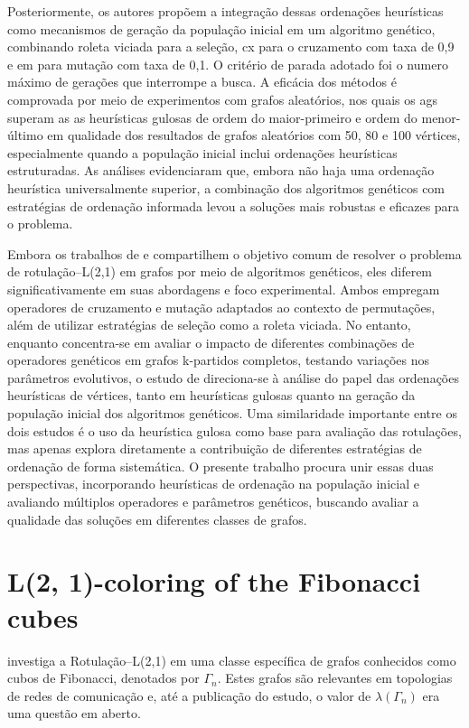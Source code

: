 Posteriormente, os autores propõem a integração dessas ordenações heurísticas como mecanismos de geração da população inicial em um algoritmo genético, combinando roleta viciada para a seleção, \gls{cx} para o cruzamento com taxa de 0{,}9 e \gls{em} para mutação com taxa de 0{,}1. O critério de parada adotado foi o numero máximo de gerações que interrompe a busca. A eficácia dos métodos é comprovada por meio de experimentos com grafos aleatórios, nos quais os \glspl{ag} superam as as heurísticas gulosas de ordem do maior-primeiro e ordem do menor-último em qualidade dos resultados de grafos aleatórios com 50, 80 e 100 vértices, especialmente quando a população inicial inclui ordenações heurísticas estruturadas. As análises evidenciaram que, embora não haja uma ordenação heurística universalmente superior, a combinação dos algoritmos genéticos com estratégias de ordenação informada levou a soluções mais robustas e eficazes para o problema.

Embora os trabalhos de  e  compartilhem o objetivo comum de resolver o problema de rotulação–L(2,1) em grafos por meio de algoritmos genéticos, eles diferem significativamente em suas abordagens e foco experimental. Ambos empregam operadores de cruzamento e mutação adaptados ao contexto de permutações, além de utilizar estratégias de seleção como a roleta viciada. No entanto, enquanto  concentra-se em avaliar o impacto de diferentes combinações de operadores genéticos em grafos k-partidos completos, testando variações nos parâmetros evolutivos, o estudo de  direciona-se à análise do papel das ordenações heurísticas de vértices, tanto em heurísticas gulosas quanto na geração da população inicial dos algoritmos genéticos. Uma similaridade importante entre os dois estudos é o uso da heurística gulosa como base para avaliação das rotulações, mas apenas  explora diretamente a contribuição de diferentes estratégias de ordenação de forma sistemática. O presente trabalho procura unir essas duas perspectivas, incorporando heurísticas de ordenação na população inicial e avaliando múltiplos operadores e parâmetros genéticos, buscando avaliar a qualidade das soluções em diferentes classes de grafos.

\section{L(2, 1)-coloring of the Fibonacci cubes}

 investiga a Rotulação–L(2,1) em uma classe específica de grafos conhecidos como cubos de Fibonacci, denotados por $\Gamma_n$. Estes grafos são relevantes em topologias de redes de comunicação e, até a publicação do estudo, o valor de $\lambda(\Gamma_n)$ era uma questão em aberto.

